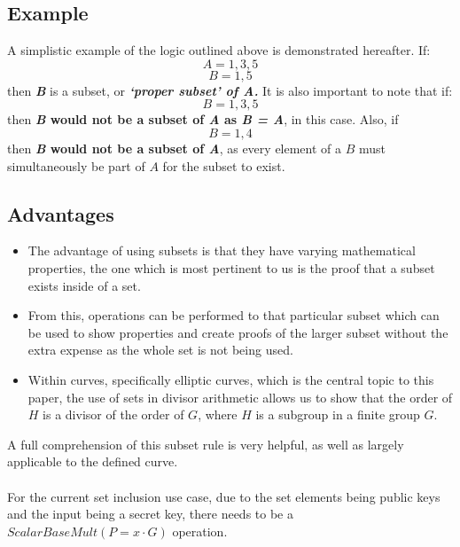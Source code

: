 \documentclass{article}
\begin{document}
\subsection{Example}
A simplistic example of the logic outlined above is demonstrated hereafter. If:  $$ A={1,3,5} $$
$$ B={1,5} $$ then \textbf{\textit{B}} is a subset, or \textbf{\textit{‘proper subset’ of A.}} 
It is also important to note that if: $$ B={1,3,5} $$ then \textbf{\textit{B} would not be a subset of \textit{A} as \textit{B = A}}, in this case. Also, if $$ B={1,4} $$ then \textbf{\textit{B} would not be a subset of \textit{A}}, as every element of a $B$ must simultaneously be part of $A$ for the subset to exist.
\subsection{Advantages}
\begin{itemize}
    \item The advantage of using subsets is that they have varying mathematical properties, the one which is most pertinent to us is the proof that a subset exists inside of a set.
    \item From this, operations can be performed to that particular subset which can be used to show properties and create proofs of the larger subset without the extra expense as the whole set is not being used.
    \item Within curves, specifically elliptic curves, which is the central topic to this paper, the use of sets in divisor arithmetic allows us to show that the order of $H$ is a divisor of the order of $G$, where $H$ is a subgroup in a finite group $G$.
\end{itemize}
A full comprehension of this subset rule is very helpful, as well as largely applicable to the defined curve. \\\\
For the current set inclusion use case, due to the set elements being public keys and the input being a secret key, there needs to be a $ScalarBaseMult (P=x\cdot G)$ operation.
\end{document}

